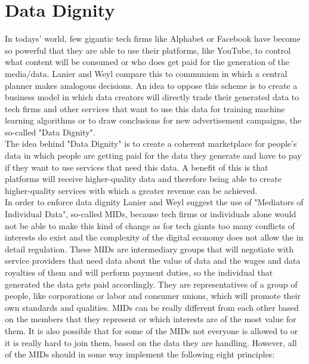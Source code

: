 \documentclass[a4paper,12pt]{report}
\begin{document}
	\section[Data Dignity]{Data Dignity \cite{LanierWeylBlueprint}}
	\startsection
		In todays' world, few gigantic tech firms like Alphabet or Facebook have become so powerful that they are able to use their platforms, like YouTube, to control what content will be consumed or who does get paid for the generation of the media/data. Lanier and Weyl compare this to communism in which a central planner makes analogous decisions. An idea to oppose this scheme is to create a business model in which data creators will directly trade their generated data to tech firms and other services that want to use this data for training machine learning algorithms or to draw conclusions for new advertisement campaigns, the so-called "Data Dignity". \\
		The idea behind "Data Dignity" is to create a coherent marketplace for people's data in which people are getting paid for the data they generate and have to pay if they want to use services that need this data. A benefit of this is that platforms will receive higher-quality data and therefore being able to create higher-quality services with which a greater revenue can be achieved. \\
		In order to enforce data dignity Lanier and Weyl suggest the use of "Mediators of Individual Data", so-called MIDs, because tech firms or individuals alone would not be able to make this kind of change as for tech giants too many conflicts of interests do exist and the complexity of the digital economy does not allow the in detail regulation. These MIDs are intermediary groups that will negotiate with service providers that need data about the value of data and the wages and data royalties of them and will perform payment duties, so the individual that generated the data gets paid accordingly. They are representatives of a group of people, like corporations or labor and consumer unions, which will promote their own standards and qualities. MIDs can be really different from each other based on the members that they represent or which interests are of the most value for them. It is also possible that for some of the MIDs not everyone is allowed to or it is really hard to join them, based on the data they are handling. However, all of the MIDs should in some way implement the following eight principles:
\end{document}
